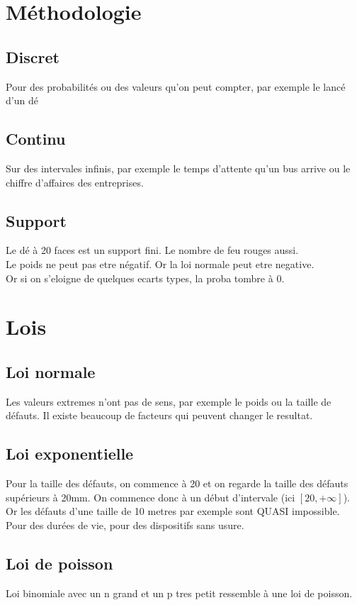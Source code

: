 \documentclass[11pt]{article}
\begin{document}
\section{Méthodologie}
\subsection{Discret}
Pour des probabilités ou des valeurs qu'on peut compter, par exemple le lancé d'un dé
\subsection{Continu}
Sur des intervales infinis, par exemple le temps d'attente qu'un bus arrive ou le chiffre d'affaires des entreprises.

\subsection{Support}
Le dé à 20 faces est un support fini. Le nombre de feu rouges aussi.\\
Le poids ne peut pas etre négatif. Or la loi normale peut etre negative.\\
Or si on s'eloigne de quelques ecarts types, la proba tombre à 0.

\pagebreak

\section{Lois}
\subsection{Loi normale}
Les valeurs extremes n'ont pas de sens, par exemple le poids ou la taille de défauts.
Il existe beaucoup de facteurs qui peuvent changer le resultat.

\subsection{Loi exponentielle}
Pour la taille des défauts, on commence à 20 et on regarde la taille des défauts supérieurs à 20mm.
On commence donc à un début d'intervale (ici $[20,+\infty]$). Or les défauts d'une taille de 10 metres par exemple sont QUASI impossible.
Pour des durées de vie, pour des dispositifs sans usure.

\subsection{Loi de poisson}
Loi binomiale avec un n grand et un p tres petit ressemble à une loi de poisson.
\end{document}
